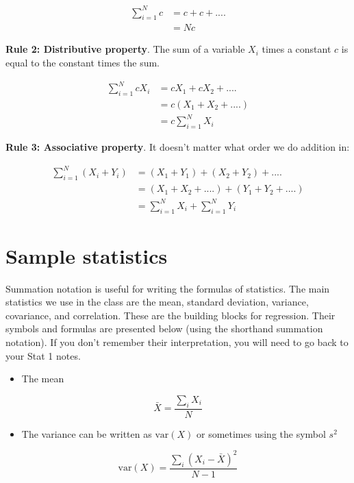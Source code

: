 \documentclass[
  letterpaper,
  DIV=11,
  numbers=noendperiod]{scrreprt}
\providecommand{\tightlist}{%
  \setlength{\itemsep}{0pt}\setlength{\parskip}{0pt}}\usepackage{longtable,booktabs,array}
\begin{document}
\begin{align}
\sum_{i = 1}^{N} c &= c + c +  .... \\
& = Nc 
\end{align}

\textbf{Rule 2: Distributive property}. The sum of a variable \(X_i\)
times a constant \(c\) is equal to the constant times the sum.

\begin{align}
\sum_{i = 1}^{N} c X_i &= cX_1 + cX_2 + .... \\
& = c(X_1 + X_2 + ....) \\ 
& = c \sum_{i = 1}^{N} X_i 
\end{align}

\textbf{Rule 3: Associative property}. It doesn't matter what order we
do addition in:

\begin{align}
\sum_{i = 1}^{N} (X_i + Y_i) &= (X_1 + Y_1) + (X_2 + Y_2) + .... \\
& = (X_1 + X_2 + ....) + (Y_1 + Y_2 + ....) \\
& = \sum_{i = 1}^{N} X_i  + \sum_{i = 1}^{N} Y_i 
\end{align}

\hypertarget{sec-stats-1}{%
\section{Sample statistics}\label{sec-stats-1}}

Summation notation is useful for writing the formulas of statistics. The
main statistics we use in the class are the mean, standard deviation,
variance, covariance, and correlation. These are the building blocks for
regression. Their symbols and formulas are presented below (using the
shorthand summation notation). If you don't remember their
interpretation, you will need to go back to your Stat 1 notes.

\begin{itemize}
\tightlist
\item
  The mean
\end{itemize}

\[\bar X = \frac{\sum_i X_i}{N}\]

\begin{itemize}
\tightlist
\item
  The variance can be written as \(\text{var}(X)\) or sometimes using
  the symbol \(s^2\)
\end{itemize}

\[ \text{var}(X) = \frac{\sum_i (X_i - \bar X)^2}{N - 1} \]
\end{document}
